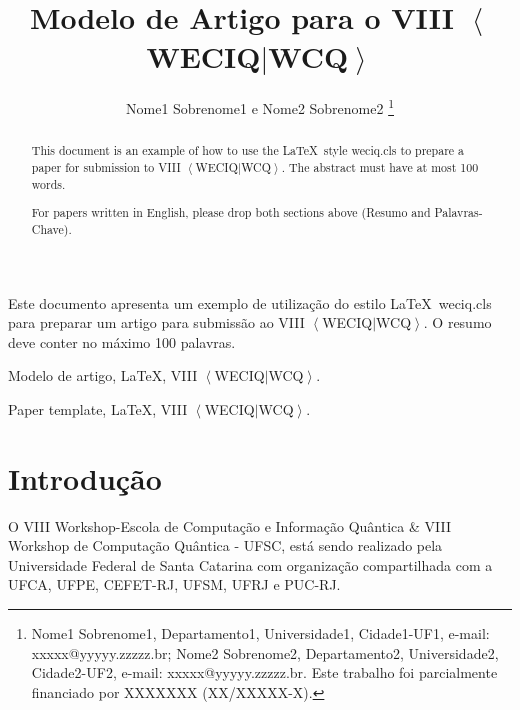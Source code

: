 \documentclass{weciq}
\begin{document}
\newcommand{\weciqwcq}{VIII $\left<\right.$WECIQ$|$WCQ$\left.\right>$}

\title{Modelo de Artigo para o \weciqwcq}

\author{Nome1 Sobrenome1 e Nome2 Sobrenome2
\thanks{Nome1 Sobrenome1, Departamento1, Universidade1, Cidade1-UF1, e-mail: xxxxx@yyyyy.zzzzz.br; Nome2 Sobrenome2, Departamento2, Universidade2, Cidade2-UF2, e-mail: xxxxx@yyyyy.zzzzz.br. Este trabalho foi parcialmente financiado por XXXXXXX (XX/XXXXX-X).}%
}

\maketitle



\begin{resumo}
Este documento apresenta um exemplo de utilização do estilo \LaTeX\ weciq.cls para preparar um artigo para submissão ao \weciqwcq. O resumo deve conter no máximo 100 palavras.
\end{resumo}
\begin{chave}
Modelo de artigo, \LaTeX, \weciqwcq.
\end{chave}


\begin{abstract}
This document is an example of how to use the \LaTeX\ style weciq.cls to prepare a paper for submission to \weciqwcq. The abstract must have at most 100 words.

For papers written in English, please drop both sections above (Resumo and Palavras-Chave).
\end{abstract}
\begin{keywords}
Paper template, \LaTeX, \weciqwcq.
\end{keywords}


\section{Introdu\c{c}\~{a}o}


 O VIII Workshop-Escola de Computação e Informação Quântica \& VIII Workshop de Computação Quântica - UFSC, está sendo realizado pela Universidade Federal de Santa Catarina com organização compartilhada com a UFCA, UFPE, CEFET-RJ, UFSM, UFRJ e PUC-RJ. 
\end{document}
